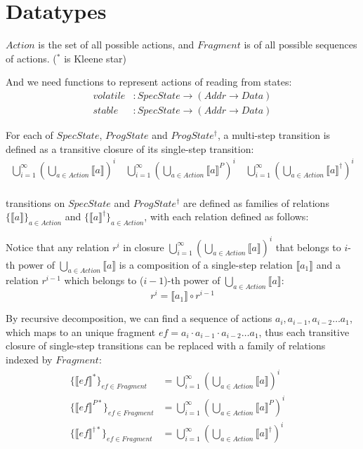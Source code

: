 \documentclass[letterpaper,twocolumn,10pt]{article}
\theoremstyle{definition}
\renewcommand{\i}[1]{\ensuremath{\mathit{#1}}}
\begin{document}
\section{Datatypes}


$Action$ is the set of all possible actions, and $\i{Fragment}$ is of all possible sequences of actions. ($^*$ is Kleene star)

And we need functions to represent actions of reading from states:
\begin{align*}
	volatile &: \i{SpecState} \to (\i{Addr} \to \i{Data})\\
	stable &: \i{SpecState} \to (\i{Addr} \to \i{Data})
\end{align*}

For each of $\i{SpecState}$, $\i{ProgState}$ and $\i{ProgState^\dagger}$, a multi-step transition is defined as a transitive closure of its single-step transition:
\begin{align*}
	\bigcup_{i=1}^\infty\left(\bigcup_{a \in Action} \llbracket a \rrbracket \right)^i \quad
	\bigcup_{i=1}^\infty\left(\bigcup_{a \in Action} \llbracket a \rrbracket^P \right)^i \quad
	\bigcup_{i=1}^\infty\left(\bigcup_{a \in Action} \llbracket a \rrbracket^\dagger \right)^i \\
\end{align*}


transitions on $\i{SpecState}$ and $\i{ProgState^\dagger}$ are defined as families of relations $\{ \llbracket a \rrbracket \}_\i{a \in Action}$ and $\{ \llbracket a \rrbracket^\dagger \}_\i{a \in Action}$, with each relation defined as follows:

Notice that any relation $r^i$ in closure $\bigcup_{i=1}^\infty\left(\bigcup_{a \in Action} \llbracket a \rrbracket \right)^i$ that belongs to $i$-th power of $\bigcup_{a \in Action} \llbracket a \rrbracket$ is a composition of a single-step relation $\llbracket a_1 \rrbracket$ and a relation $r^{i-1}$ which belongs to (${i-1}$)-th power of $\bigcup_{a \in Action} \llbracket a \rrbracket$:
$$r^i = \llbracket a_1 \rrbracket \circ r^{i-1}$$

By recursive decomposition, we can find a sequence of actions $a_i, a_{i-1}, a_{i-2} \dots a_1$, which maps to an unique fragment $\i{ef} = a_i \cdot a_{i-1} \cdot a_{i-2} \dots a_1$, thus each transitive closure of single-step transitions can be replaced with a family of relations indexed by $\i {Fragment}$:
\begin{align*}
	\{ \llbracket \i{ef} \rrbracket^* \}_\i{ef \in Fragment} &= 
	\bigcup_{i=1}^\infty\left(\bigcup_{a \in Action} \llbracket a \rrbracket \right)^i \quad\\
	\{ \llbracket \i{ef} \rrbracket^{P*} \}_\i{ef \in Fragment} &= 
	\bigcup_{i=1}^\infty\left(\bigcup_{a \in Action} \llbracket a \rrbracket^P \right)^i \quad\\
	\{ \llbracket \i{ef} \rrbracket^{\dagger*} \}_\i{ef \in Fragment} &= 
	\bigcup_{i=1}^\infty\left(\bigcup_{a \in Action} \llbracket a \rrbracket^\dagger \right)^i
\end{align*}
\end{document}
